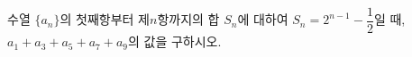 수열 $\{a_n\}$의 첫째항부터 제$n$항까지의 합 $S_n$에 대하여 $S_n=2^{n-1}-\dfrac{1}{2}$일 때, $a_1+a_3+a_5+a_7+a_9$의 값을 구하시오.
